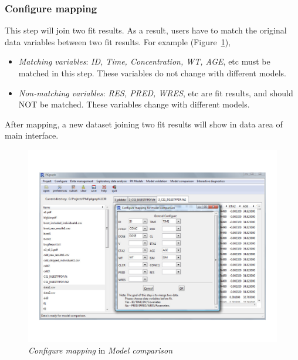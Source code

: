 \documentclass[a4paper]{article}
\begin{document}
\subsubsection{Configure mapping}
This step will join two fit results. As a result, users have to match the original data variables between two fit results. For example (Figure~\ref{modelcMap}),
\begin{itemize}
	\item \textit{Matching variables}: \textit{ID, Time, Concentration, WT, AGE}, etc must be matched in this step. These variables do not change with different models.
	\item \textit{Non-matching variables}: \textit{RES, PRED, WRES}, etc are fit results, and should NOT be matched. These variables change with different models.
\end{itemize}
After mapping, a new dataset joining two fit results will show in data area of main interface.
\begin{figure}[h!tb] \centering
\includegraphics[scale=0.6]{modelcMap.pdf}
\caption{\textit{Configure mapping} in \textit{Model comparison}}
\label{modelcMap}
\end{figure}
\end{document}
